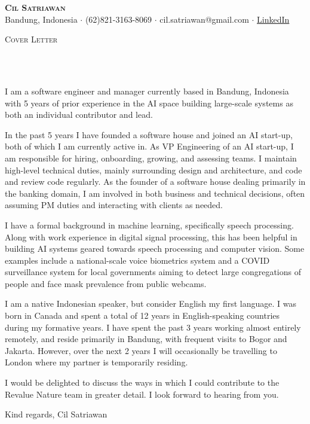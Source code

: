 \documentclass[11pt]{article}
\newcommand{\lineunder} {
    \vspace*{-8pt} \\
    \hspace*{-10pt} \hrulefill \\
}
\newcommand{\header} [1] {
    \begin{center}
      {\large \scshape {#1}}
      \lineunder
    \end{center}
    \vspace*{-8pt}
}
\newcommand{\profile} [5] {
    \vspace*{-15pt}
    \begin{center}
        {\huge \scshape \textbf{#1}}\\
        \vspace{1mm}
        \small {#2} $\cdot$ {#3} $\cdot$ {#4} $\cdot$ {#5}
    \end{center}
    \vspace*{-8pt}
}
\begin{document}
\vspace*{-40pt}

\profile{Cil Satriawan}{Bandung, Indonesia}{(62)821-3163-8069}
{cil.satriawan@gmail.com}{\href{https://www.linkedin.com/in/cil-satriawan-a60601111}{LinkedIn}}

\header{Cover Letter}
\vspace{1mm}

I am a software engineer and manager currently based in Bandung, Indonesia with
5 years of prior experience in the AI space building large-scale systems as both
an individual contributor and lead. 
\vspace{3mm}

In the past 5 years I have founded a software house and joined an AI start-up,
both of which I am currently active in. As VP Engineering of an AI start-up,
I am responsible for hiring, onboarding, growing, and assessing teams. I maintain
high-level technical duties, mainly surrounding design and architecture, and code
and review code regularly. As the founder of a software house dealing primarily
in the banking domain, I am involved in both business and technical decisions,
often assuming PM duties and interacting with clients as needed.
\vspace{3mm}

I have a formal background in machine learning, specifically speech processing.
Along with work experience in digital signal processing, this has been helpful
in building AI systems geared towards speech processing and computer vision.
Some examples include a national-scale voice biometrics system and a COVID
surveillance system for local governments aiming to detect large congregations
of people and face mask prevalence from public webcams. 
\vspace{3mm}

I am a native Indonesian speaker, but consider English my first language. I
was born in Canada and spent a total of 12 years in English-speaking countries
during my formative years. I have spent the past 3 years working almost entirely
remotely, and reside primarily in Bandung, with frequent visits to Bogor and
Jakarta. However, over the next 2 years I will occasionally be travelling to
London where my partner is temporarily residing.
\vspace{3mm}

I would be delighted to discuss the ways in which I could contribute to the
Revalue Nature team in greater detail. I look forward to hearing from you.
\vspace{3mm}

Kind regards,\newline
Cil Satriawan

\ 
\end{document}
